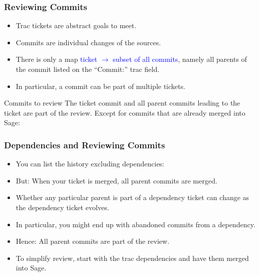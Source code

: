 \begin{frame}
  \frametitle{Reviewing Commits}

  \begin{itemize}
  \item Trac tickets are abstract goals to meet.
  \item Commits are individual changes of the sources.
  \item There is only a map \textcolor{blue}{ticket $\to$ subset of
      all commits}, namely all parents of the commit listed on the
    ``Commit:'' trac field.
  \item In particular, a commit can be part of multiple tickets.
  \end{itemize}
  \begin{block}{Commits to review}
    The ticket commit and all parent commits leading to the ticket are
    part of the review. Except for commits that are already merged
    into Sage:
    \\
  \end{block}

\end{frame}


\begin{frame}
  \frametitle{Dependencies and Reviewing Commits}

  \begin{itemize}
  \item 
    You can list the history excluding dependencies:\\
  \item But: When your ticket is merged, all parent commits are
    merged.
  \item Whether any particular parent is part of a dependency ticket
    can change as the dependency ticket evolves.
  \item In particular, you might end up with abandoned commits from a
    dependency.
  \item Hence: All parent commits are part of the review. 
  \item To simplify review, start with the trac dependencies and have
    them merged into Sage.
  \end{itemize}
\end{frame}





